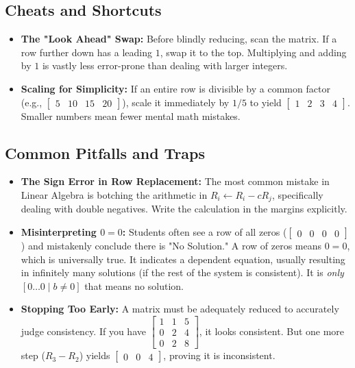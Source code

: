 \documentclass[11pt]{article}
\begin{document}
\subsection{Cheats and Shortcuts}
\begin{itemize}
    \item \textbf{The "Look Ahead" Swap:} Before blindly reducing, scan the matrix. If a row further down has a leading $1$, swap it to the top. Multiplying and adding by $1$ is vastly less error-prone than dealing with larger integers.
    \item \textbf{Scaling for Simplicity:} If an entire row is divisible by a common factor (e.g., $\begin{bmatrix} 5 & 10 & 15 & 20 \end{bmatrix}$), scale it immediately by $1/5$ to yield $\begin{bmatrix} 1 & 2 & 3 & 4 \end{bmatrix}$. Smaller numbers mean fewer mental math mistakes.
\end{itemize}

\subsection{Common Pitfalls and Traps}
\begin{itemize}
    \item \textbf{The Sign Error in Row Replacement:} The most common mistake in Linear Algebra is botching the arithmetic in $R_i \leftarrow R_i - cR_j$, specifically dealing with double negatives. Write the calculation in the margins explicitly. 
    \item \textbf{Misinterpreting $0 = 0$:} Students often see a row of all zeros ($\begin{bmatrix} 0 & 0 & 0 & 0 \end{bmatrix}$) and mistakenly conclude there is "No Solution." A row of zeros means $0 = 0$, which is universally true. It indicates a dependent equation, usually resulting in infinitely many solutions (if the rest of the system is consistent). It is \textit{only} $[0 \dots 0 \mid b \neq 0]$ that means no solution.
    \item \textbf{Stopping Too Early:} A matrix must be adequately reduced to accurately judge consistency. If you have $\begin{bmatrix} 1 & 1 & 5 \\ 0 & 2 & 4 \\ 0 & 2 & 8 \end{bmatrix}$, it looks consistent. But one more step ($R_3 - R_2$) yields $\begin{bmatrix} 0 & 0 & 4 \end{bmatrix}$, proving it is inconsistent.
\end{itemize}
\end{document}
